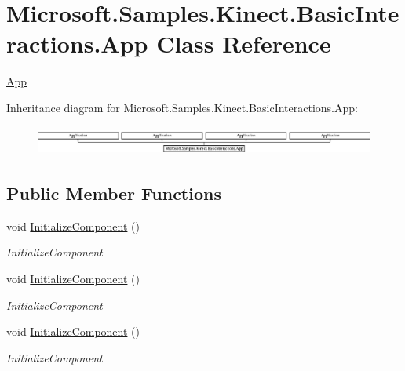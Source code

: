 \hypertarget{class_microsoft_1_1_samples_1_1_kinect_1_1_basic_interactions_1_1_app}{\section{Microsoft.\-Samples.\-Kinect.\-Basic\-Interactions.\-App Class Reference}
\label{class_microsoft_1_1_samples_1_1_kinect_1_1_basic_interactions_1_1_app}
}


\hyperlink{class_microsoft_1_1_samples_1_1_kinect_1_1_basic_interactions_1_1_app}{App}  


Inheritance diagram for Microsoft.\-Samples.\-Kinect.\-Basic\-Interactions.\-App\-:\begin{figure}[H]
\begin{center}
\leavevmode
\includegraphics[height=0.965517cm]{class_microsoft_1_1_samples_1_1_kinect_1_1_basic_interactions_1_1_app}
\end{center}
\end{figure}
\subsection*{Public Member Functions}
\begin{DoxyCompactItemize}
\item 
void \hyperlink{class_microsoft_1_1_samples_1_1_kinect_1_1_basic_interactions_1_1_app_a3d743b84607bda47c5fbd40933d437de}{Initialize\-Component} ()
\begin{DoxyCompactList}\small\item\em Initialize\-Component \end{DoxyCompactList}\item 
void \hyperlink{class_microsoft_1_1_samples_1_1_kinect_1_1_basic_interactions_1_1_app_a3d743b84607bda47c5fbd40933d437de}{Initialize\-Component} ()
\begin{DoxyCompactList}\small\item\em Initialize\-Component \end{DoxyCompactList}\item 
void \hyperlink{class_microsoft_1_1_samples_1_1_kinect_1_1_basic_interactions_1_1_app_a3d743b84607bda47c5fbd40933d437de}{Initialize\-Component} ()
\begin{DoxyCompactList}\small\item\em Initialize\-Component \end{DoxyCompactList}\end{DoxyCompactItemize}
